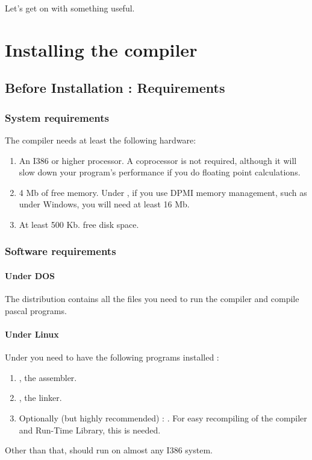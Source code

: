 \documentclass{report}
\begin{document}
Let's get on with something useful.


\chapter{Installing the compiler}
\label{ch:Installation}

\section{Before Installation : Requirements}

%
%
\subsection{System requirements}
The compiler needs at least the following hardware:
\begin{enumerate}
\item An I386 or higher processor. A coprocessor is not required, although it
will slow down your program's performance if you do floating point calculations.
\item 4 Mb of free memory. Under \dos, if you use DPMI memory management,
such as under Windows, you will need at least 16 Mb.
\item At least 500 Kb. free disk space.
\end{enumerate}

\subsection{Software requirements}

\subsubsection{Under DOS}
The \dos distribution contains all the files you need to run the compiler
and compile pascal programs.

\subsubsection{Under Linux}
Under \linux you need to have the following programs installed :
\begin{enumerate}
\item \gnu {}, the \gnu assembler.
\item \gnu {}, the \gnu linker.
\item Optionally (but highly recommended) : \gnu {}. For easy
recompiling of the compiler and Run-Time Library, this is needed.
\end{enumerate}
Other than that, \fpc should run on almost any I386 \linux system.
\end{document}
